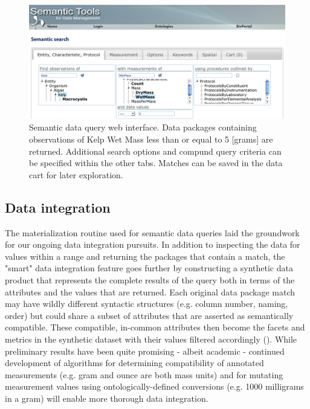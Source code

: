 \begin{figure}
\centering
\includegraphics[width=1.0\textwidth]{images/metacat-query.png}
\caption{Semantic data query web interface. Data packages containing observations of Kelp Wet Mass less than or equal to 5 [grams] are returned. Additional search options and compund query criteria can be specified within the other tabs. Matches can be saved in the data cart for later exploration.}
\label{fig:metacat-query}
\end{figure}

\subsection{Data integration}
The materialization routine used for semantic data queries laid the groundwork for our ongoing data integration pursuits.
In addition to inspecting the data for values within a range and returning the packages that contain a match, the "smart" data integration feature goes further by constructing a synthetic data product that represents the complete results of the query both in terms of the attributes and the values that are returned. Each original data package match may have wildly different syntactic structures (e.g. column number, naming, order) but could share a subset of attributes that are asserted as semantically compatible. These compatible, in-common attributes then become the facets and metrics in the synthetic dataset with their values filtered accordingly (). While preliminary results have been quite promising - albeit academic - continued development of algorithms for determining compatibility of annotated measurements (e.g. gram and ounce are both mass units) and for mutating measurement values using ontologically-defined conversions (e.g. 1000 milligrams in a gram) will enable more thorough data integration.


